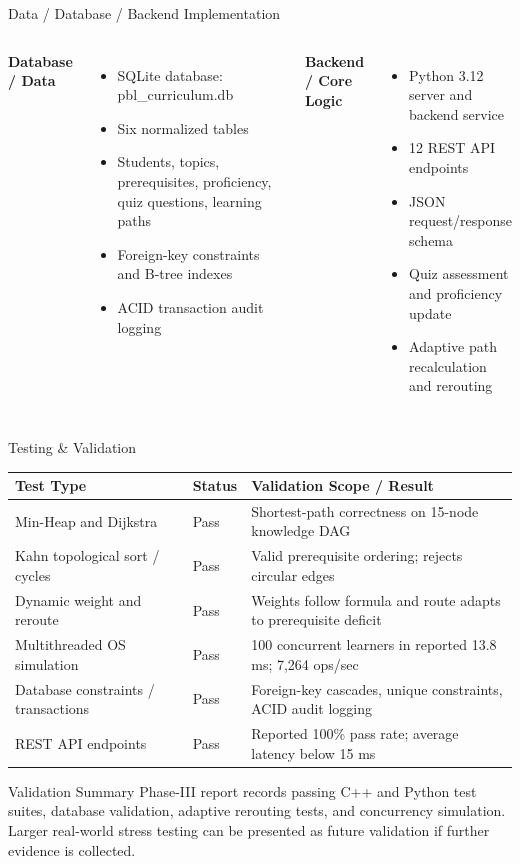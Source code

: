 \documentclass[aspectratio=169,11pt]{beamer}
\begin{document}
\begin{frame}{Data / Database / Backend Implementation}
\begin{columns}[T,totalwidth=\textwidth]
\textbf{Database / Data}
\begin{itemize}\itemsep3pt
\item SQLite database: pbl\_curriculum.db
\item Six normalized tables
\item Students, topics, prerequisites, proficiency, quiz questions, learning paths
\item Foreign-key constraints and B-tree indexes
\item ACID transaction audit logging
\end{itemize}
\textbf{Backend / Core Logic}
\begin{itemize}\itemsep3pt
\item Python 3.12 server and backend service
\item 12 REST API endpoints
\item JSON request/response schema
\item Quiz assessment and proficiency update
\item Adaptive path recalculation and rerouting
\end{itemize}
\end{columns}
\end{frame}

\begin{frame}{Testing \& Validation}
\scriptsize
\begin{center}
\renewcommand{\arraystretch}{1.25}
\begin{tabularx}{.96\textwidth}{@{}p{2.4cm}p{1.5cm}X@{}}
\toprule
\textbf{Test Type} & \textbf{Status} & \textbf{Validation Scope / Result}\\
\midrule
Min-Heap and Dijkstra & Pass & Shortest-path correctness on 15-node knowledge DAG\\
Kahn topological sort / cycles & Pass & Valid prerequisite ordering; rejects circular edges\\
Dynamic weight and reroute & Pass & Weights follow formula and route adapts to prerequisite deficit\\
Multithreaded OS simulation & Pass & 100 concurrent learners in reported 13.8 ms; 7,264 ops/sec\\
Database constraints / transactions & Pass & Foreign-key cascades, unique constraints, ACID audit logging\\
REST API endpoints & Pass & Reported 100\% pass rate; average latency below 15 ms\\
\bottomrule
\end{tabularx}
\end{center}
\begin{block}{Validation Summary}
Phase-III report records passing C++ and Python test suites, database validation, adaptive rerouting tests, and concurrency simulation. Larger real-world stress testing can be presented as future validation if further evidence is collected.
\end{block}
\end{frame}
\end{document}
